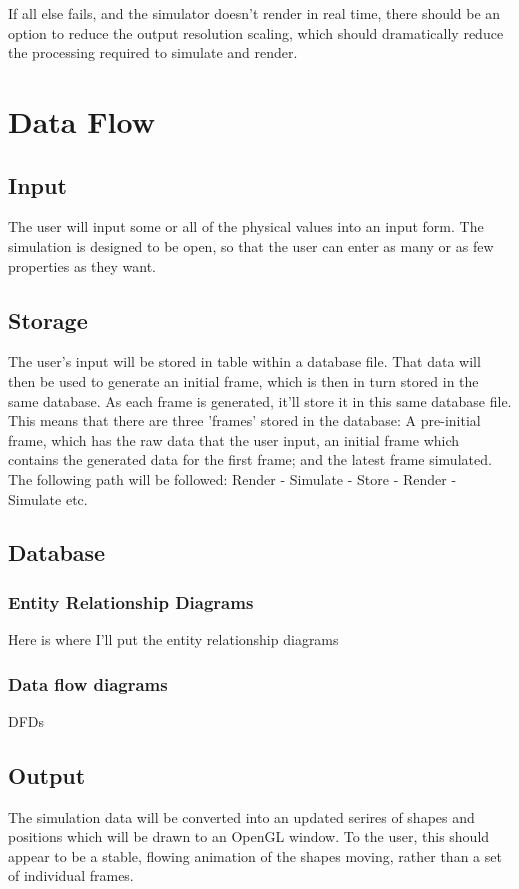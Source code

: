 If all else fails, and the simulator doesn't render in real time, there should be an option to reduce the output resolution scaling, which should dramatically reduce the processing required to simulate and render.

\section{Data Flow}
\subsection{Input}
	The user will input some or all of the physical values into an input form. The simulation is designed to be open, so that the user can enter as many or as few properties as they want.

\subsection{Storage}
	The user's input will be stored in table within a database file. That data will then be used to generate an initial frame, which is then in turn stored in the same database. As each frame is generated, it'll store it in this same database file. This means that there are three 'frames' stored in the database: A pre-initial frame, which has the raw data that the user input, an initial frame which contains the generated data for the first frame; and the latest frame simulated. The following path will be followed: Render - Simulate - Store - Render - Simulate etc.

\subsection{Database}

\subsubsection{Entity Relationship Diagrams}
	Here is where I'll put the entity relationship diagrams

\subsubsection{Data flow diagrams}
	DFDs


\subsection{Output}
	The simulation data will be  converted into an updated serires of shapes and positions which will be drawn to an OpenGL window. To the user, this should appear to be a stable, flowing animation of the shapes moving, rather than a set of individual frames.




